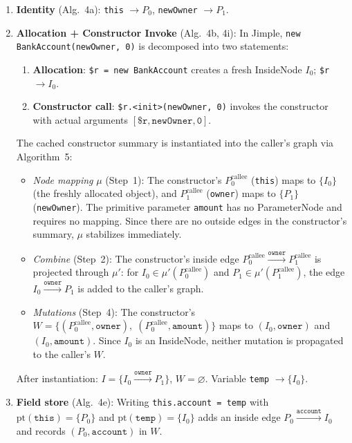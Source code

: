 \begin{enumerate}
\item \textbf{Identity} (Alg.~4a): \texttt{this} $\to P_0$, \texttt{newOwner} $\to P_1$.

\item \textbf{Allocation + Constructor Invoke} (Alg.~4b, 4i):
  In Jimple, \texttt{new BankAccount(newOwner, 0)} is decomposed into two statements:
  \begin{enumerate}
    \item[(a)] \textbf{Allocation}: \texttt{\$r = new BankAccount} creates a fresh InsideNode $I_0$; \texttt{\$r} $\to I_0$.
    \item[(b)] \textbf{Constructor call}: \texttt{\$r.\textless init\textgreater(newOwner, 0)} invokes the constructor with actual arguments $[\texttt{\$r}, \texttt{newOwner}, \texttt{0}]$.
  \end{enumerate}

  The cached constructor summary is instantiated into the caller's graph via Algorithm~5:

  \begin{itemize}
  \item \textit{Node mapping} $\mu$ (Step~1): The constructor's $P_0^{\text{callee}}$ (\texttt{this}) maps to $\{I_0\}$ (the freshly allocated object), and $P_1^{\text{callee}}$ (\texttt{owner}) maps to $\{P_1\}$ (\texttt{newOwner}).
  The primitive parameter \texttt{amount} has no ParameterNode and requires no mapping.
  Since there are no outside edges in the constructor's summary, $\mu$ stabilizes immediately.

  \item \textit{Combine} (Step~2): The constructor's inside edge $P_0^{\text{callee}} \xrightarrow{\texttt{owner}} P_1^{\text{callee}}$ is projected through $\mu'$: for $I_0 \in \mu'(P_0^{\text{callee}})$ and $P_1 \in \mu'(P_1^{\text{callee}})$, the edge $I_0 \xrightarrow{\texttt{owner}} P_1$ is added to the caller's graph.

  \item \textit{Mutations} (Step~4): The constructor's $W = \{(P_0^{\text{callee}}, \texttt{owner}),\; (P_0^{\text{callee}}, \texttt{amount})\}$ maps to $(I_0, \texttt{owner})$ and $(I_0, \texttt{amount})$. Since $I_0$ is an InsideNode, neither mutation is propagated to the caller's $W$.
  \end{itemize}

  \noindent
  After instantiation: $I = \{I_0 \xrightarrow{\texttt{owner}} P_1\}$, $W = \varnothing$. Variable \texttt{temp} $\to \{I_0\}$.

\item \textbf{Field store} (Alg.~4e): Writing \texttt{this.account = temp} with $\text{pt}(\texttt{this}) = \{P_0\}$ and $\text{pt}(\texttt{temp}) = \{I_0\}$ adds an inside edge $P_0 \xrightarrow{\texttt{account}} I_0$ and records $(P_0, \texttt{account})$ in $W$.
\end{enumerate}

